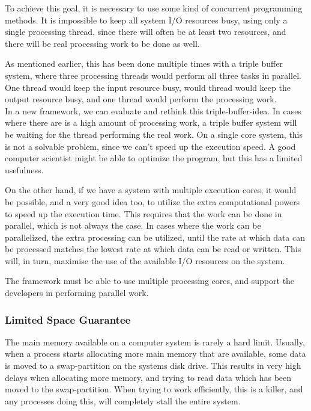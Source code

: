 \documentclass[a4paper]{article}
\begin{document}
To achieve this goal, it is necessary to use some kind of concurrent programming methods. It is impossible to keep all system I/O resources busy, using only a single processing thread, since there will often be at least two resources, and there will be real processing work to be done as well. 

As mentioned earlier, this has been done multiple times with a triple buffer system, where three processing threads would perform all three tasks in parallel. One thread would keep the input resource busy, would thread would keep the output resource busy, and one thread would perform the processing work.\\
 

In a new framework, we can evaluate and rethink this triple-buffer-idea. In cases where there are is a high amount of processing work, a triple buffer system will be waiting for the thread performing the real work. On a single core system, this is not a solvable problem, since we can't speed up the execution speed. A good computer scientist might be able to optimize the program, but this has a limited usefulness. 

On the other hand, if we have a system with multiple execution cores, it would be possible, and a very good idea too, to utilize the extra computational powers to speed up the execution time. This requires that the work can be done in parallel, which is not always the case. In cases where the work can be parallelized, the extra processing can be utilized, until the rate at which data can be processed matches the lowest rate at which data can be read or written. This will, in turn, maximise the use of the available I/O resources on the system.

The framework must be able to use multiple processing cores, and support the developers in performing parallel work.


\subsubsection{Limited Space Guarantee}
The main memory available on a computer system is rarely a hard limit. Usually, when a process starts allocating more main memory that are available, some data is moved to a swap-partition on the systems disk drive. This results in very high delays when allocating more memory, and trying to read data which has been moved to the swap-partition. When trying to work efficiently, this is a killer, and any processes doing this, will completely stall the entire system. 
\end{document}
